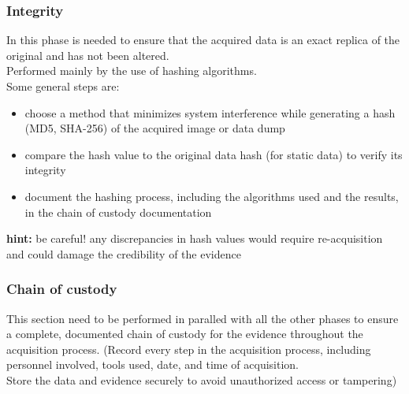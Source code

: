 \subsubsection{Integrity}
In this phase is needed to ensure that the acquired data is an exact replica of the original and has not been altered. \\ Performed mainly by the use of hashing algorithms. \\ Some general steps are: 
\begin{itemize}[itemsep=0pt]
    \item choose a method that minimizes system interference while generating a hash (MD5, SHA-256) of the acquired image or data dump
    \item compare the hash value to the original data hash (for static data) to verify its integrity
    \item document the hashing process, including the algorithms used and the results, in the chain of custody documentation
\end{itemize} 
\textbf{hint:} be careful! any discrepancies in hash values would require re-acquisition and could damage the credibility of the evidence

\subsubsection{Chain of custody}
This section need to be performed in paralled with all the other phases to ensure a complete, documented chain of custody for the evidence throughout the acquisition process. (Record every step in the acquisition process, including personnel involved, tools used, date, and time of acquisition. \\ Store the data and evidence securely to avoid unauthorized access or tampering)

